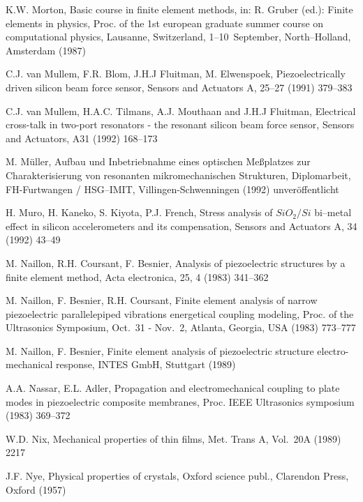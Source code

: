 \begin{thebibliography}{xxx}
 K.W. Morton, Basic course in finite element methods, in: R. Gruber (ed.):
 Finite elements in physics, Proc. of the 1st european graduate summer
 course on computational physics, Lausanne, Switzerland, 1--10~September,
 North--Holland, Amsterdam (1987)

 C.J. van Mullem, F.R. Blom, J.H.J Fluitman, M. Elwenspoek,
 Piezoelectrically driven silicon beam force sensor, Sensors and Actuators A,
 25--27 (1991) 379--383

 C.J. van Mullem, H.A.C. Tilmans, A.J. Mouthaan and J.H.J Fluitman,
 Electrical cross-talk in two-port resonators - the resonant silicon beam
 force sensor, Sensors and Actuators, A31 (1992) 168--173

 M. Müller, Aufbau und Inbetriebnahme eines optischen Meßplatzes zur
 Charakterisierung von resonanten mikromechanischen Strukturen,
 Diplomarbeit, FH-Furtwangen / HSG--IMIT, Villingen-Schwenningen (1992)
 unveröffentlicht

 H. Muro, H. Kaneko, S. Kiyota, P.J. French, Stress analysis of
 $SiO_{2}/Si$ bi--metal effect in silicon accelerometers and its
 compensation, Sensors and Actuators A, 34 (1992) 43--49

 M. Naillon, R.H. Coursant, F. Besnier, Analysis of piezoelectric structures
 by a finite element method, Acta electronica, 25, 4 (1983) 341--362

 M. Naillon, F. Besnier, R.H. Coursant, Finite element analysis of narrow
 piezoelectric parallelepiped vibrations energetical coupling modeling,
 Proc. of the Ultrasonics Symposium, Oct.~31 - Nov.~2, Atlanta, Georgia,
 USA (1983) 773--777

 M. Naillon, F. Besnier, Finite element analysis of piezoelectric structure
 electro-mechanical response, INTES GmbH, Stuttgart (1989)

 A.A. Nassar, E.L. Adler, Propagation and electromechanical coupling to
 plate modes in piezoelectric composite membranes, Proc. IEEE Ultrasonics
 symposium (1983) 369--372

 W.D. Nix, Mechanical properties of thin films, Met. Trans A, Vol.~20A
 (1989) 2217

 J.F. Nye, Physical properties of crystals, Oxford science publ.,
 Clarendon Press, Oxford (1957)


\end{thebibliography}
